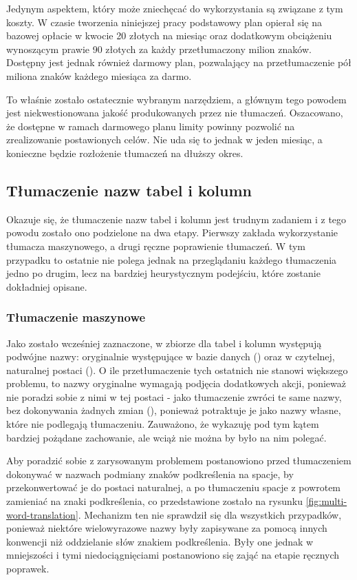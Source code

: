 Jedynym aspektem, który może zniechęcać do wykorzystania  są związane z tym koszty. W czasie tworzenia niniejszej pracy podstawowy plan opierał się na bazowej opłacie w kwocie 20 złotych na miesiąc oraz dodatkowym obciążeniu wynoszącym prawie 90 złotych za każdy przetłumaczony milion znaków. Dostępny jest jednak również darmowy plan, pozwalający na przetłumaczenie pół miliona znaków każdego miesiąca za darmo.

To właśnie  zostało ostatecznie wybranym narzędziem, a głównym tego powodem jest niekwestionowana jakość produkowanych przez nie tłumaczeń. Oszacowano, że dostępne w ramach darmowego planu limity powinny pozwolić na zrealizowanie postawionych celów. Nie uda się to jednak w jeden miesiąc, a konieczne będzie rozłożenie tłumaczeń na dłuższy okres.

\subsection{Tłumaczenie nazw tabel i kolumn}
Okazuje się, że tłumaczenie nazw tabel i kolumn jest trudnym zadaniem i z tego powodu zostało ono podzielone na dwa etapy. Pierwszy zakłada wykorzystanie tłumacza maszynowego, a drugi ręczne poprawienie tłumaczeń. W tym przypadku to ostatnie nie polega jednak na przeglądaniu każdego tłumaczenia jedno po drugim, lecz na bardziej heurystycznym podejściu, które zostanie dokładniej opisane.

\subsubsection{Tłumaczenie maszynowe}
Jako zostało wcześniej zaznaczone, w zbiorze  dla tabel i kolumn występują podwójne nazwy: oryginalnie występujące w bazie danych () oraz w czytelnej, naturalnej postaci (). O ile przetłumaczenie tych ostatnich nie stanowi większego problemu, to nazwy oryginalne wymagają podjęcia dodatkowych akcji, ponieważ  nie poradzi sobie z nimi w tej postaci - jako tłumaczenie zwróci te same nazwy, bez dokonywania żadnych zmian (), ponieważ potraktuje je jako nazwy własne, które nie podlegają tłumaczeniu. Zauważono, że  wykazuję pod tym kątem bardziej pożądane zachowanie, ale wciąż nie można by było na nim polegać. 

Aby poradzić sobie z zarysowanym problemem postanowiono przed tłumaczeniem dokonywać w nazwach podmiany znaków podkreślenia na spacje, by przekonwertować je do postaci naturalnej, a po tłumaczeniu spacje z powrotem zamieniać na znaki podkreślenia, co przedstawione zostało na rysunku \ref{fig:multi-word-translation}. Mechanizm ten nie sprawdził się dla wszystkich przypadków, ponieważ niektóre wielowyrazowe nazwy były zapisywane za pomocą innych konwencji niż oddzielanie słów znakiem podkreślenia. Były one jednak w mniejszości i tymi niedociągnięciami postanowiono się zająć na etapie ręcznych poprawek.

